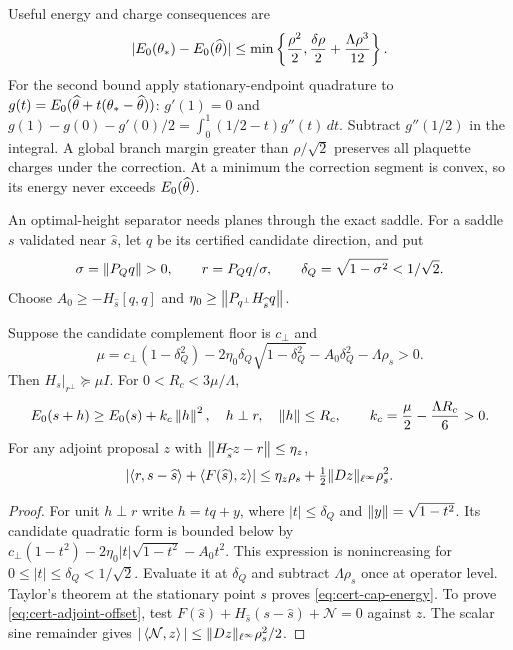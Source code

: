 Useful energy and charge consequences are
\begin{equation}\label{eq:cert-critical-energy}
 |E_0(\theta_*)-E_0(\widehat\theta)|
 \le\min\left\{\frac{\rho^2}{2},
               \frac{\delta\rho}{2}+\frac{\Lambda\rho^3}{12}\right\}.
\end{equation}
For the second bound apply stationary-endpoint quadrature to
$g(t)=E_0(\widehat\theta+t(\theta_*-\widehat\theta))$:
$g'(1)=0$ and
$g(1)-g(0)-g'(0)/2=\int_0^1(1/2-t)g''(t)\,dt$.
Subtract $g''(1/2)$ in the integral. A global branch margin greater than
$\rho/\sqrt2$ preserves all plaquette charges under the correction.
At a minimum the correction segment is convex, so its energy never
exceeds $E_0(\widehat\theta)$.

An optimal-height separator needs planes through the exact saddle.
For a saddle $s$ validated near $\widehat s$, let $q$ be its certified
candidate direction, and put
\[
 \sigma=\left\lVert P_Qq\right\rVert>0,\qquad r=P_Qq/\sigma,
 \qquad \delta_Q=\sqrt{1-\sigma^2}<1/\sqrt2.
\]
Choose $A_0\ge-H_{\widehat s}[q,q]$ and
$\eta_0\ge\left\lVert P_{q^\perp}H_{\widehat s}q\right\rVert$.

\begin{lemma}\label{lem:cert-cap}
Suppose the candidate complement floor is $c_{\perp}$ and
\begin{equation}\label{eq:cert-cap-coercivity}
 \mu=c_{\perp}(1-\delta_Q^2)-2\eta_0\delta_Q\sqrt{1-\delta_Q^2}
               -A_0\delta_Q^2-\Lambda\rho_s>0.
\end{equation}
Then $H_s|_{r^\perp}\succeq\mu I$. For $0<R_c<3\mu/\Lambda$,
\begin{equation}\label{eq:cert-cap-energy}
 E_0(s+h)\ge E_0(s)+k_c\left\lVert h\right\rVert^2,
 \quad h\perp r,\quad\left\lVert h\right\rVert\le R_c,
 \qquad k_c=\frac\mu2-\frac{\Lambda R_c}{6}>0.
\end{equation}
For any adjoint proposal $z$ with
$\left\lVert H_{\widehat s}z-r\right\rVert\le\eta_z$,
\begin{equation}\label{eq:cert-adjoint-offset}
 \left|\left\langle r,s-\widehat s\right\rangle+\left\langle F(\widehat s),z\right\rangle\right|
 \le\eta_z\rho_s+\tfrac12\|Dz\|_{\ell^\infty}\rho_s^2.
\end{equation}
\end{lemma}
\begin{proof}
For unit $h\perp r$ write $h=tq+y$, where $|t|\le\delta_Q$ and
$\left\lVert y\right\rVert=\sqrt{1-t^2}$. Its candidate quadratic form is bounded below
by $c_{\perp}(1-t^2)-2\eta_0|t|\sqrt{1-t^2}-A_0t^2$.
This expression is nonincreasing for $0\le|t|\le\delta_Q<1/\sqrt2$.
Evaluate it at $\delta_Q$ and subtract $\Lambda\rho_s$ once at operator
level. Taylor's theorem at the stationary point $s$ proves
\eqref{eq:cert-cap-energy}. To prove \eqref{eq:cert-adjoint-offset},
test $F(\widehat s)+H_{\widehat s}(s-\widehat s)+\mathcal N=0$ against
$z$. The scalar sine remainder gives
$|\left\langle\mathcal N,z\right\rangle|\le\|Dz\|_{\ell^\infty}\rho_s^2/2$.
\end{proof}

